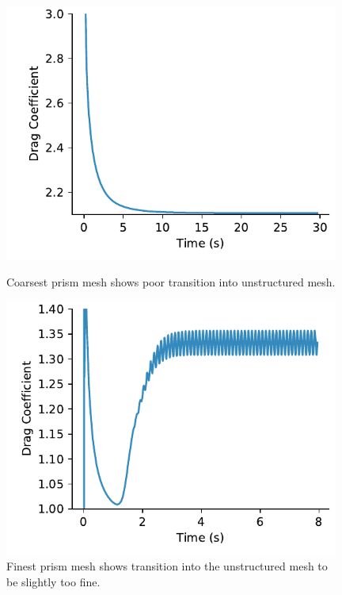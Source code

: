 \documentclass[10pt,english]{article}
\begin{document}
\begin{figure}[h]
\centering
\begin{minipage}{.49\textwidth}
  \centering
\includegraphics[trim={0.0cm 0cm 0.0cm 0cm},clip,width=0.98\textwidth]{CD_time_20}
\caption{Coarsest prism mesh shows poor transition into unstructured mesh.}
\label{f:CD_time_20}
\end{minipage}%
\hspace{5pt}
\begin{minipage}{.49\textwidth}
  \centering
\includegraphics[trim={0.0cm 0cm 0.0cm 0cm},clip,width=0.98\textwidth]{CD_time_150}
\caption{\vspace{0pt}Finest prism mesh shows transition into the unstructured mesh to be slightly too fine.}
\label{f:CD_time_150}
\end{minipage}
\end{figure}
\end{document}

